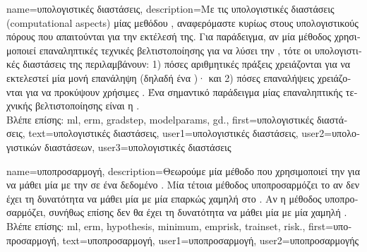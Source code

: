 {name={\foreignlanguage{greek}{υπολογιστικές διαστάσεις}}, 
	description={\foreignlanguage{greek}{Με τις υπολογιστικές διαστάσεις} (computational aspects) 
		\foreignlanguage{greek}{μίας μεθόδου} , \foreignlanguage{greek}{αναφερόμαστε κυρίως στους υπολογιστικούς πόρους  
		που απαιτούνται για την εκτέλεσή της. Για παράδειγμα, αν μία μέθοδος}  \foreignlanguage{greek}{χρησιμοποιεί  
		επαναληπτικές τεχνικές βελτιστοποίησης για να λύσει την} , \foreignlanguage{greek}{τότε οι υπολογιστικές διαστάσεις 
		της περιλαμβάνουν: 1) πόσες αριθμητικές πράξεις χρειάζονται για να εκτελεστεί μία μονή επανάληψη (δηλαδή ένα} )·  
		\foreignlanguage{greek}{και 2) πόσες επαναλήψεις χρειάζονται για να προκύψουν χρήσιμες} . 
		\foreignlanguage{greek}{Ένα σημαντικό παράδειγμα μίας επαναληπτικής τεχνικής βελτιστοποίησης είναι η} .\\
		\foreignlanguage{greek}{Βλέπε επίσης:} \gls{ml}, \gls{erm}, \gls{gradstep}, \gls{modelparams}, \gls{gd}.}, 
	first={\foreignlanguage{greek}{υπολογιστικές διαστάσεις}},
	text={\foreignlanguage{greek}{υπολογιστικές διαστάσεις}},
	user1={\foreignlanguage{greek}{υπολογιστικές διαστάσεις}}, %
	user2={\foreignlanguage{greek}{υπολογιστικών διαστάσεων}}, %
	user3={\foreignlanguage{greek}{υπολογιστικές διαστάσεις}} %
}

{name={\foreignlanguage{greek}{υποπροσαρμογή}},
	description={\foreignlanguage{greek}{Θεωρούμε μία μέθοδο} 
		 \foreignlanguage{greek}{που χρησιμοποιεί την}  \foreignlanguage{greek}{για να 
		μάθει μία}  \foreignlanguage{greek}{με την}   
		\foreignlanguage{greek}{σε ένα δεδομένο} . \foreignlanguage{greek}{Μία τέτοια μέθοδος 
		υποπροσαρμόζει το}  \foreignlanguage{greek}{αν δεν έχει τη δυνατότητα να μάθει μία} 
		 \foreignlanguage{greek}{με μία επαρκώς χαμηλή}  \foreignlanguage{greek}{στο} 
		. \foreignlanguage{greek}{Αν η μέθοδος υποπροσαρμόζει, συνήθως επίσης δεν θα έχει τη 
		δυνατότητα να μάθει μία}  \foreignlanguage{greek}{με μία χαμηλή} .\\
		\foreignlanguage{greek}{Βλέπε επίσης:} \gls{ml}, \gls{erm}, \gls{hypothesis}, \gls{minimum}, \gls{emprisk}, \gls{trainset}, \gls{risk}.},
	first={\foreignlanguage{greek}{υποπροσαρμογή}},
	text={\foreignlanguage{greek}{υποπροσαρμογή}},
	user1={\foreignlanguage{greek}{υποπροσαρμογή}}, %
    	user2={\foreignlanguage{greek}{υποπροσαρμογής}} %
}

